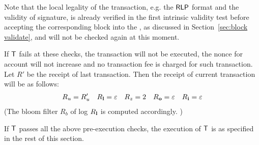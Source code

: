 
	

Note that the local legality of the transaction, 
e.g. the $\mathsf{RLP}$ format
and the validity of signature, 
is already verified in the first intrinsic validity test before accepting the corresponding block into the \name \tg, as discussed in Section~\ref{sec:block validate},
and will not be checked again at this moment.

If $\textsf{T}$ fails at these checks, the transaction will not be executed, the nonce for account will not increase and no transaction fee is charged for such transaction. Let $R'$ be the receipt of last transaction.
Then the receipt of current transaction will be as follows:
\begin{align}
	R_u=R'_u && R_{\bf l}=\mathbb{\varepsilon} && R_z=2 && R_{\bf o}=\mathbb{\varepsilon} && R_{\bf i}=\mathbb{\varepsilon}
\end{align}
%
(The bloom filter $R_b$ of log $R_{\bf l}$ is computed accordingly. 
)






If $\textsf{T}$ passes all the above pre-execution checks, the execution of $\textsf{T}$ is as specified in the rest of this section.




